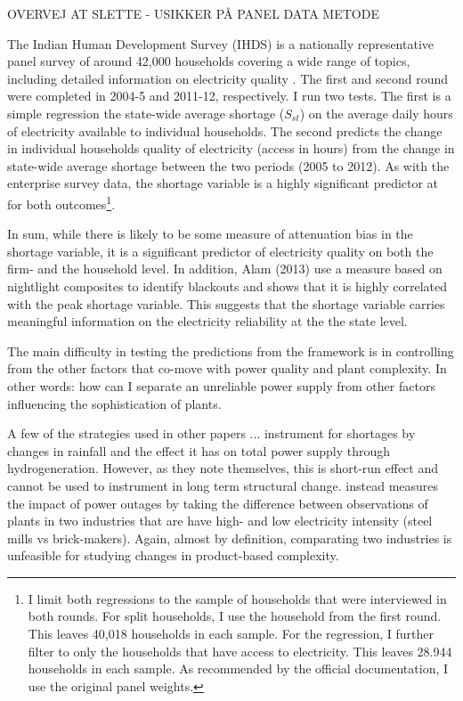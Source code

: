 \documentclass[11pt]{article}
\begin{document}
% 


% 

OVERVEJ AT SLETTE - USIKKER PÅ PANEL DATA METODE

The Indian Human Development Survey (IHDS) is a nationally representative panel survey of around 42,000 households covering a wide range of topics, including detailed information on electricity quality \citep{desai_india_2018-1,desai_india_2018}. The first and second round were completed in 2004-5 and 2011-12, respectively. I run two tests. The first is a simple regression the state-wide average shortage (\(S_{st}\)) on the average daily hours of electricity available to individual households. The second predicts the change in individual households quality of electricity (access in hours) from the change in state-wide average shortage between the two periods (2005 to 2012). As with the enterprise survey data, the shortage variable is a highly significant predictor at for both outcomes\footnote{I limit both regressions to the sample of households that were interviewed in both rounds. For split households, I use the household from the first round. This leaves 40,018 households in each sample. For the regression, I further filter to only the households that have access to electricity. This leaves 28.944 households in each sample. As recommended by the official documentation, I use the original panel weights.}.

In sum, while there is likely to be some measure of attenuation bias in the shortage variable, it is a significant predictor of electricity quality on both the firm- and the household level. In addition, Alam (2013) use a measure based on nightlight composites to identify blackouts and shows that it is highly correlated with the peak shortage variable. This suggests that the shortage variable carries meaningful information on the electricity reliability at the the state level.

The main difficulty in testing the predictions from the framework is in controlling from the other factors that co-move with power quality and plant complexity. In other words: how can I separate an unreliable power supply from other factors influencing the sophistication of plants. 

A few of the strategies used in other papers ...  \cite{allcott_how_2016} instrument for shortages by changes in rainfall and the effect it has on total power supply through hydrogeneration. However, as they note themselves, this is short-run effect and cannot be used to instrument in long term structural change.  \cite{alam_coping_2013} instead measures the impact of power outages by taking the difference between observations of plants in two industries that are have high- and low electricity intensity (steel mills vs brick-makers). Again, almost by definition, comparating two industries is unfeasible for studying changes in product-based complexity.
\end{document}
